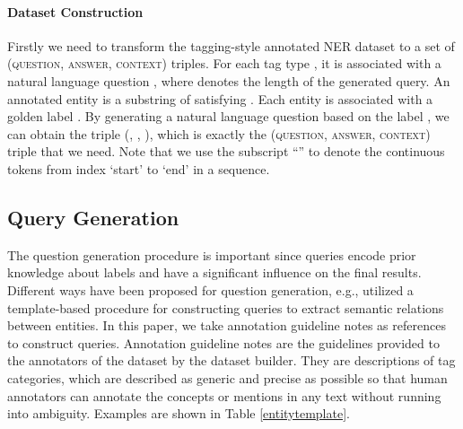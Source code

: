 \documentclass[11pt,a4paper]{article}
\begin{document}
\paragraph{Dataset Construction}
Firstly we  need to transform the tagging-style annotated NER dataset  to a set of 
\textsc{(question, answer, context)} triples. 
For each tag type , it is associated with a natural language question , where  denotes the length of the generated query. 
 An annotated entity  is a substring of  satisfying . Each entity is associated 
 with a golden label . By generating a natural language question  based on the label , 
we can obtain  the triple (, , ), which is exactly the \textsc{(question, answer, context)} triple that we need. Note that we use the subscript ``'' to denote the continuous tokens from index `start' to  `end' in a sequence. 
\begin{comment}
\algrenewcommand{\algorithmicrequire}{\textbf{Input:}}
\algrenewcommand{\algorithmicensure}{\textbf{Output:}}
\newcommand{\To}{{\bf to }}
\newcommand{\IF}{{\bf if }}
\newcommand{\DO}{{\bf do }}
\newcommand{\ENDIF}{{\bf endif}}
\begin{algorithm}[t]
\small
\begin{algorithmic}[1]
\Require sequence , 
QuestionTemplates, 
\Ensure a label sequence 
\State
\State 
\For {question  in QuestionTemplates}
  \State  = MRCModel(, )
  \State \IF   \DO \\ 
  \hspace{0.7cm}   = y
   \State \ENDIF
 \EndFor
 \State \Return 
\end{algorithmic}
\caption{Overview of the proposed model.}
\label{alg}
\end{algorithm}
\end{comment}

\subsection{Query Generation}
The question generation procedure is important since queries encode prior knowledge about labels and have a significant influence on the final results. 
Different ways have been proposed for question generation, e.g., 
 utilized a template-based procedure for constructing queries to extract semantic relations between entities. 
In this paper, we take annotation guideline notes as references to construct queries. 
Annotation guideline notes are the guidelines provided to the annotators of the dataset 
by the dataset builder. They are  descriptions of tag categories, which are described as generic and precise as possible so that human annotators can annotate the concepts or mentions in any text without running into ambiguity. Examples are shown in Table \ref{entitytemplate}. 
\end{document}
